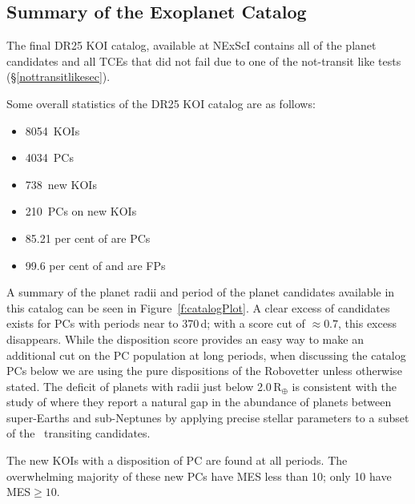 \def \nkois {8054}
\def \ncand {4034}
\def \newkois {738}
\def \newcand {210}
\def \completeness {85.21}
\def \reliability {97.14}
\def \effectiveness {99.6}

\subsection{Summary of the Exoplanet Catalog}

The final DR25 KOI catalog, available at NExScI contains all of the planet candidates and all TCEs that did not fail due to one of the not-transit like tests (\S\ref{nottransitlikesec}). 


Some overall statistics of the DR25 KOI catalog are as follows:
\begin{itemize}
    \item \nkois{}~KOIs
    \item \ncand{}~PCs
    \item \newkois{}~new KOIs
    \item \newcand{}~PCs on new KOIs
    \item \completeness{} per cent of  are PCs
    \item \effectiveness{} per cent of  and  are FPs
\end{itemize}

A summary of the planet radii and period of the planet candidates available in this catalog can be seen in Figure~\ref{f:catalogPlot}. A clear excess of candidates exists for PCs with periods near to 370\,d;  with a score cut of $\approx0.7$, this excess disappears. While the disposition score provides an easy way to make an additional cut on the PC population at long periods, when discussing the catalog PCs below we are using the pure dispositions of the Robovetter unless otherwise stated. The deficit of planets with radii just below 2.0\,R$_{\oplus}$ is consistent with the study of \citet{Fulton2017} where they report a natural gap in the abundance of planets between super-Earths and sub-Neptunes by applying precise stellar parameters to a subset of the \kepler\ transiting candidates. 

The new KOIs with a disposition of PC are found at all periods. The overwhelming majority of these new PCs have MES less than 10; only 10 have MES$\geq 10 $. 

